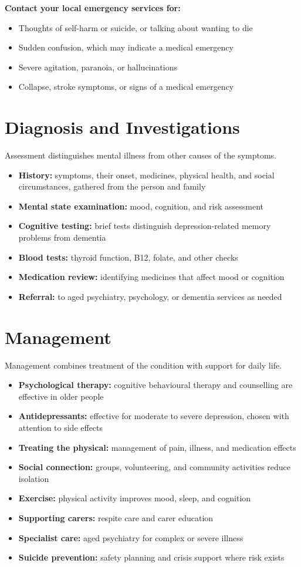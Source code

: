 \textbf{Contact your local emergency services for:}
\begin{itemize}
    \item Thoughts of self-harm or suicide, or talking about wanting to die
    \item Sudden confusion, which may indicate a medical emergency
    \item Severe agitation, paranoia, or hallucinations
    \item Collapse, stroke symptoms, or signs of a medical emergency
\end{itemize}

\section*{Diagnosis and Investigations}
Assessment distinguishes mental illness from other causes of the symptoms.
\begin{itemize}
    \item \textbf{History:} symptoms, their onset, medicines, physical health, and social circumstances, gathered from the person and family
    \item \textbf{Mental state examination:} mood, cognition, and risk assessment
    \item \textbf{Cognitive testing:} brief tests distinguish depression-related memory problems from dementia
    \item \textbf{Blood tests:} thyroid function, B12, folate, and other checks
    \item \textbf{Medication review:} identifying medicines that affect mood or cognition
    \item \textbf{Referral:} to aged psychiatry, psychology, or dementia services as needed
\end{itemize}

\section*{Management}
Management combines treatment of the condition with support for daily life.
\begin{itemize}
    \item \textbf{Psychological therapy:} cognitive behavioural therapy and counselling are effective in older people
    \item \textbf{Antidepressants:} effective for moderate to severe depression, chosen with attention to side effects
    \item \textbf{Treating the physical:} management of pain, illness, and medication effects
    \item \textbf{Social connection:} groups, volunteering, and community activities reduce isolation
    \item \textbf{Exercise:} physical activity improves mood, sleep, and cognition
    \item \textbf{Supporting carers:} respite care and carer education
    \item \textbf{Specialist care:} aged psychiatry for complex or severe illness
    \item \textbf{Suicide prevention:} safety planning and crisis support where risk exists
\end{itemize}

